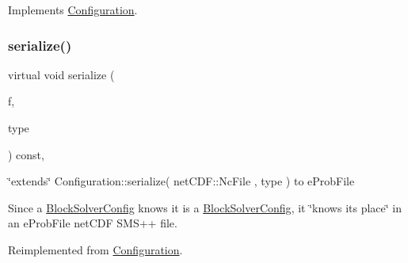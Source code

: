Implements \mbox{\hyperlink{class_s_m_spp__di__unipi__it_1_1_configuration_a27ae9e4279482d52342c7958c34a43c6}{Configuration}}.

\mbox{\label{class_s_m_spp__di__unipi__it_1_1_block_solver_config_a978c6b5919ce07663f3c325a99013bac}} 
\subsubsection{\texorpdfstring{serialize()}{serialize()}\hspace{0.1cm}{\footnotesize\ttfamily [1/2]}}
{\footnotesize\ttfamily virtual void serialize (\begin{DoxyParamCaption}\item[{net\+C\+D\+F\+::\+Nc\+File \&\&}]{f,  }\item[{const int}]{type }\end{DoxyParamCaption}) const\hspace{0.3cm}{\ttfamily [override]}, {\ttfamily [virtual]}}



\char`\"{}extends\char`\"{} Configuration\+::serialize( net\+C\+D\+F\+::\+Nc\+File , type ) to e\+Prob\+File 

Since a \mbox{\hyperlink{class_s_m_spp__di__unipi__it_1_1_block_solver_config}{Block\+Solver\+Config}} knows it is a \mbox{\hyperlink{class_s_m_spp__di__unipi__it_1_1_block_solver_config}{Block\+Solver\+Config}}, it \char`\"{}knows its
place\char`\"{} in an e\+Prob\+File net\+C\+DF S\+M\+S++ file. 

Reimplemented from \mbox{\hyperlink{class_s_m_spp__di__unipi__it_1_1_configuration_a76975f9a636fcf85b4ed642b58422aaf}{Configuration}}.

\mbox{\label{class_s_m_spp__di__unipi__it_1_1_block_solver_config_a8a626d908100f4419905d89f771150aa}} 
